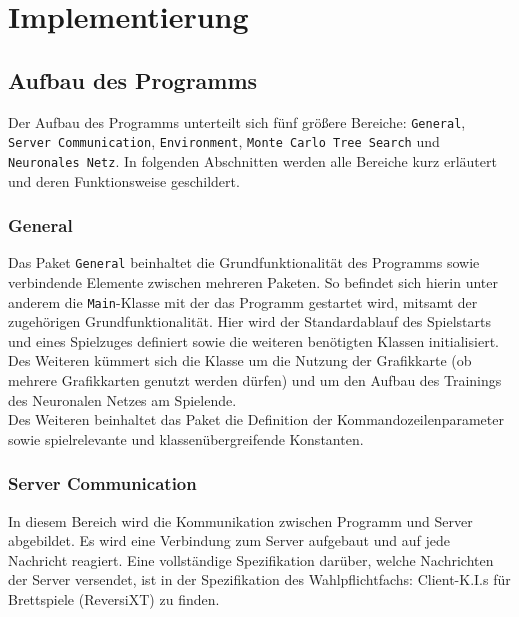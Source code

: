 \documentclass[12pt,a4paper]{article}
\begin{document}
\newpage
\section{Implementierung}

\subsection{Aufbau des Programms}
Der Aufbau des Programms unterteilt sich fünf größere Bereiche: \texttt{General}, \texttt{Server Communication}, \texttt{Environment}, \texttt{Monte Carlo Tree Search} und \texttt{Neuronales Netz}. In folgenden Abschnitten werden alle Bereiche kurz erläutert und deren Funktionsweise geschildert.

\subsubsection{General}
Das Paket \texttt{General} beinhaltet die Grundfunktionalität des Programms sowie verbindende Elemente zwischen mehreren Paketen.
So befindet sich hierin unter anderem die \texttt{Main}-Klasse mit der das Programm gestartet wird, mitsamt der zugehörigen Grundfunktionalität. Hier wird der Standardablauf des Spielstarts und eines Spielzuges definiert sowie die weiteren benötigten Klassen initialisiert. Des Weiteren k\"{u}mmert sich die Klasse um die Nutzung der Grafikkarte (ob mehrere Grafikkarten genutzt werden d\"{u}rfen) und um den Aufbau des Trainings des Neuronalen Netzes am Spielende.\\
Des Weiteren beinhaltet das Paket die Definition der Kommandozeilenparameter sowie spielrelevante und klassenübergreifende Konstanten.

\subsubsection{Server Communication}
In diesem Bereich wird die Kommunikation zwischen Programm und Server abgebildet. Es wird eine Verbindung zum Server aufgebaut und auf jede Nachricht reagiert. Eine vollständige Spezifikation darüber, welche Nachrichten der Server versendet, ist in der Spezifikation des Wahlpflichtfachs: Client-K.I.s für Brettspiele (ReversiXT) zu finden.
\end{document}
